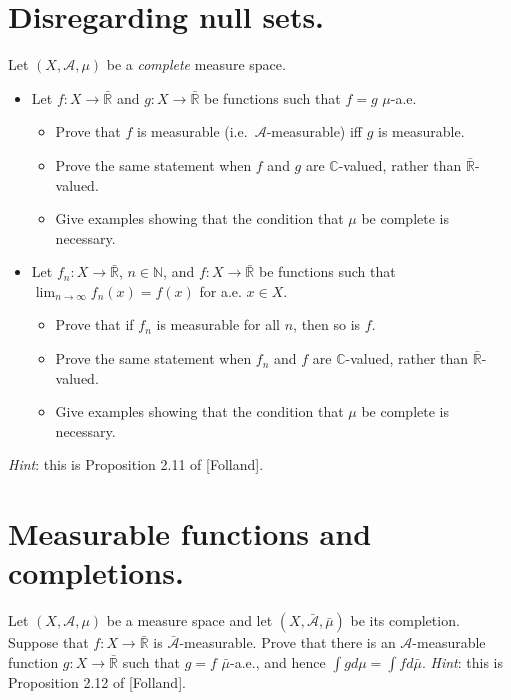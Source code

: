 \section{Disregarding null sets.}

Let \((X,\mathcal{A},\mu)\) be a \emph{complete} measure space.

\begin{itemize}
\item
  Let \(f:X\rightarrow\bar{\mathbb{R}}\) and \(g:X\rightarrow\bar{\mathbb{R}}\) be functions such that \(f = g\) \(\mu\)-a.e.

  \begin{itemize}
  \item
    Prove that \(f\) is measurable (i.e.~\(\mathcal{A}\)-measurable) iff \(g\) is measurable.
  \item
    Prove the same statement when \(f\) and \(g\) are \(\mathbb{C}\)-valued, rather than \(\bar{\mathbb{R}}\)-valued.
  \item
    Give examples showing that the condition that \(\mu\) be complete is necessary.
  \end{itemize}
\item
  Let \(f_{n}:X\rightarrow\bar{\mathbb{R}}\), \(n \in \mathbb{N}\), and \(f:X\rightarrow\bar{\mathbb{R}}\) be functions such that \(\lim_{n\rightarrow\infty}f_{n}(x) = f(x)\) for a.e. \(x \in X\).

  \begin{itemize}
  \item
    Prove that if \(f_{n}\) is measurable for all \(n\), then so is \(f\).
  \item
    Prove the same statement when \(f_{n}\) and \(f\) are \(\mathbb{C}\)-valued, rather than \(\bar{\mathbb{R}}\)-valued.
  \item
    Give examples showing that the condition that \(\mu\) be complete is necessary.
  \end{itemize}
\end{itemize}

\emph{Hint}: this is Proposition 2.11 of {[}Folland{]}.

\section{Measurable functions and completions.}

Let \((X,\mathcal{A},\mu)\) be a measure space and let \((X,\bar{\mathcal{A}},\bar{\mu})\) be its completion. Suppose that \(f:X\rightarrow\bar{\mathbb{R}}\) is \(\bar{\mathcal{A}}\)-measurable. Prove that there is an \(\mathcal{A}\)-measurable function \(g:X\rightarrow\bar{\mathbb{R}}\) such that \(g = f\) \(\bar{\mu}\)-a.e., and hence \(\int g d\mu = \int f d\bar{\mu}\). \emph{Hint}: this is Proposition 2.12 of {[}Folland{]}.

